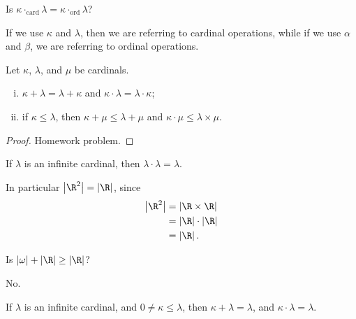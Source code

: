 \documentclass[10pt]{mypackage}
\begin{document}
\begin{question}
  Is $\kappa\cdot_{\text{card}}\lambda = \kappa\cdot_{\text{ord}}\lambda$?
\end{question}
\begin{remark}
  If we use $\kappa$ and $\lambda$, then we are referring to cardinal operations, while if we use $\alpha$ and $\beta$, we are referring to ordinal operations.
\end{remark}
\begin{theorem}
  Let $\kappa$, $\lambda$, and $\mu$ be cardinals.
  \begin{enumerate}[(i)]
    \item $\kappa + \lambda = \lambda + \kappa$ and $\kappa\cdot \lambda = \lambda \cdot \kappa$;
    \item if $\kappa \leq \lambda$, then $\kappa + \mu \leq \lambda + \mu$ and $\kappa\cdot \mu \leq \lambda\times\mu$.
  \end{enumerate}
\end{theorem}
\begin{proof}
  Homework problem.
\end{proof}
\begin{theorem}
  If $\lambda$ is an infinite cardinal, then $\lambda\cdot\lambda = \lambda$.
\end{theorem}
\begin{example}
  In particular $\left\vert \R^2 \right\vert = \left\vert \R \right\vert$, since
  \begin{align*}
    \left\vert \R^2 \right\vert &= \left\vert \R\times\R \right\vert\\
                                &= \left\vert \R \right\vert\cdot\left\vert \R \right\vert\\
                                &= \left\vert \R \right\vert.
  \end{align*}
\end{example}
\begin{question}
  Is $\left\vert \omega \right\vert + \left\vert \R \right\vert \geq \left\vert \R \right\vert$?
  \begin{answer}
    No.
  \end{answer}
\end{question}
\begin{corollary}
  If $\lambda$ is an infinite cardinal, and $0\neq \kappa \leq \lambda$, then $\kappa + \lambda = \lambda$, and $\kappa\cdot\lambda = \lambda$.
\end{corollary}
\end{document}
